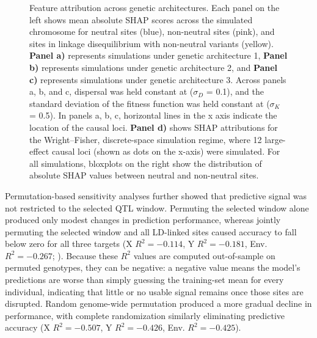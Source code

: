 \documentclass[]{article}
\begin{document}
\begin{figure}[H]
    \caption{Feature attribution across genetic architectures. Each panel on the left shows
    mean absolute SHAP scores across the simulated chromosome for neutral sites 
    (blue), non-neutral sites (pink), and sites in linkage disequilibrium with
    non-neutral variants (yellow). \textbf{Panel a)} represents simulations under
    genetic architecture 1, \textbf{Panel b)} represents simulations under
    genetic architecture 2, and \textbf{Panel c)} represents simulations under
    genetic architecture 3. Across panels a, b, and c, dispersal was held constant
    at (\(\sigma_D\) = 0.1), and the standard deviation of the fitness function was held
    constant at (\(\sigma_K\) = 0.5). 
    In panels a, b, c, horizontal lines in the
    x axis indicate the location of the causal loci.
    \textbf{Panel d)} shows SHAP attributions
    for the Wright--Fisher, discrete-space simulation regime, where 12
    large-effect causal loci (shown as dots on the x-axis) were simulated.
    For all simulations, bloxplots on the right show the distribution of
    absolute SHAP values between neutral and non-neutral sites.}

    \label{fig:shap-attribution}
\end{figure}

Permutation-based sensitivity analyses further showed that predictive signal was 
not restricted to the selected QTL window. Permuting the selected window alone 
produced only modest changes in prediction performance, whereas jointly permuting 
the selected window and all LD-linked sites caused accuracy to fall below zero for 
all three targets (X $R^2=-0.114$, Y $R^2=-0.181$, Env. $R^2=-0.267$;
). Because these $R^2$ values are computed out-of-sample on
permuted genotypes, they can be negative: a negative value means the
model's predictions are worse than simply guessing the training-set mean for every
individual, indicating that little or no usable signal remains once those sites are
disrupted. Random genome-wide permutation produced a more
gradual decline in performance, with complete randomization similarly 
eliminating predictive accuracy (X $R^2=-0.507$, Y $R^2=-0.426$, Env. $R^2=-0.425$).
\end{document}
